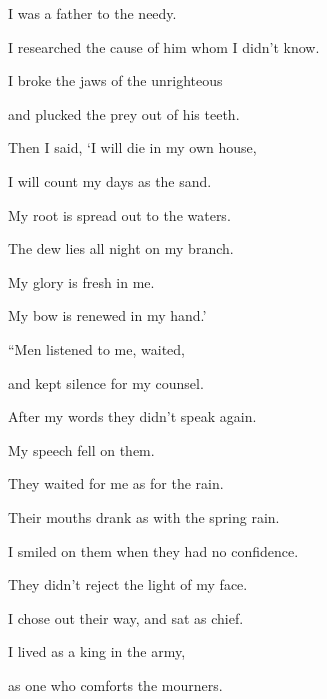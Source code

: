 {\par }{\Q {}I was a father to the needy.
\par }{\QB I researched the cause of him whom I didn’t know.
\par }{\Q {}I broke the jaws of the unrighteous
\par }{\QB and plucked the prey out of his teeth.
\par }{\Q {}Then I said, ‘I will die in my own house,
\par }{\QB I will count my days as the sand.
\par }{\Q {}My root is spread out to the waters.
\par }{\QB The dew lies all night on my branch.
\par }{\Q {}My glory is fresh in me.
\par }{\QB My bow is renewed in my hand.’
\par }{\BB \par }{\Q {}“Men listened to me, waited,
\par }{\QB and kept silence for my counsel.
\par }{\Q {}After my words they didn’t speak again.
\par }{\QB My speech fell on them.
\par }{\Q {}They waited for me as for the rain.
\par }{\QB Their mouths drank as with the spring rain.
\par }{\Q {}I smiled on them when they had no confidence.
\par }{\QB They didn’t reject the light of my face.
\par }{\Q {}I chose out their way, and sat as chief.
\par }{\QB I lived as a king in the army,
\par }{\QB as one who comforts the mourners.
\par }{\BB \par }
